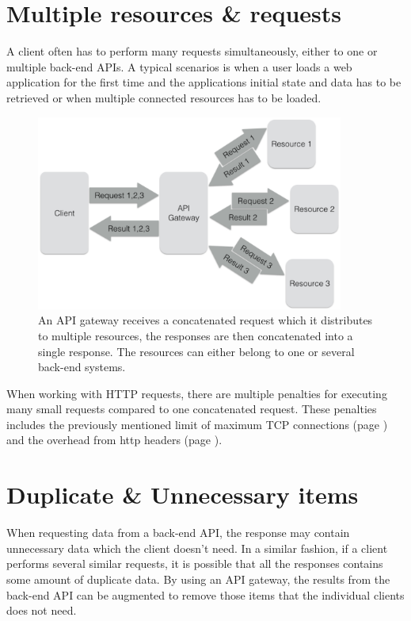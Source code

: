 \documentclass{cslthse-msc}
\begin{document}
\section{Multiple resources \& requests}
A client often has to perform many requests simultaneously, either to one or multiple back-end APIs. A typical scenarios is when a user loads a web application for the first time and the applications initial state and data has to be retrieved or when multiple connected resources has to be loaded.

\begin{figure}[H]
  \centering
    \begin{center}
      \includegraphics[width=0.9\textwidth]{images/api_gateway_concatenation.png}
    \end{center}
  \caption{An API gateway receives a concatenated request which it distributes to multiple resources, the responses are then concatenated into a single response. The resources can either belong to one or several back-end systems.}
\end{figure}

When working with HTTP requests, there are multiple penalties for executing many small requests compared to one concatenated request. These penalties includes the previously mentioned limit of maximum TCP connections (page \pageref{max_tcp}) and the overhead from http headers (page \pageref{headers}).

\section{Duplicate \& Unnecessary items}
When requesting data from a back-end API, the response may contain unnecessary data which the client doesn't need. In a similar fashion, if a client performs several similar requests, it is possible that all the responses contains some amount of duplicate data. By using an API gateway, the results from the back-end API can be augmented to remove those items that the individual clients does not need.
\end{document}
